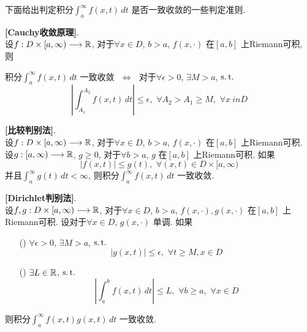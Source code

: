 \newpage

	下面给出判定积分$\int_{a}^{\infty} f(x , t) \, dt$ 是否一致收敛的一些判定准则. 

	\begin{proposition}\label{prop A.3.1}
		\textbf{[Cauchy收敛原理]}. \\
		设$f : D \times [a , \infty) \longrightarrow \mathbb{R}$, 对于$\forall x \in D$, $b > a$, $f(x , \cdot)$ 在$[a , b]$ 上Riemann可积, 则
		\begin{center}
			积分$\int_{a}^\infty f(x , t) \, dt$ 一致收敛 $\,\, \Leftrightarrow \,\,$ 对于$\forall \epsilon > 0$, $\exists M > a$, $\operatorname{s.t.}$
			\[ \left| \int_{A_1}^{A_2} f(x , t) \, dt \right| \leq \epsilon , \,\, \forall A_2 > A_1 \geq M , \,\, \forall x\ in D \]
		\end{center}
	\end{proposition}

	\vspace{8em}

	\begin{proposition}\label{prop A.3.2}
		\textbf{[比较判别法]}. \\
		设$f : D \times [a , \infty) \longrightarrow \mathbb{R}$, 对于$\forall x \in D$, $b > a$, $f(x , \cdot)$ 在$[a , b]$ 上Riemann可积. 设$g : [a , \infty) \longrightarrow \mathbb{R}$, $g \geq 0$, 对于$\forall b > a$, $g$ 在$[a , b]$ 上Riemann可积. 如果
		\[ \left| f(x  ,t) \right| \leq g(t) , \,\, \forall (x ,t) \in D \times [a , \infty) \]
		并且$\int_{a}^{\infty} g(t) \, dt < \infty$, 则积分$\int_{a}^{\infty} f(x , t) \, dt$ 一致收敛.
	\end{proposition}

	\vspace{8em}
	
	\begin{proposition}\label{prop A.3.3}
		\textbf{[Dirichlet判别法]}. \\
		设$f , g : D \times [a , \infty) \longrightarrow \mathbb{R}$, 对于$\forall x \in D$, $b > a$, $f(x , \cdot) , g(x , \cdot)$ 在$[a , b]$ 上Riemann可积. 设对于$\forall x \in D$, $g(x , \cdot)$ 单调. 如果
		\begin{enumerate}
			\item[(\rmnum{1})] $\forall \epsilon > 0$, $\exists M > a$, $\operatorname{s.t.}$
			\[ \left| g(x , t) \right| \leq \epsilon , \,\, \forall t \geq M , x \in D \]
			
			\item[(\rmnum{2})] $\exists L \in \mathbb{R}$, $\operatorname{s.t.}$
			\[ \left| \int_{a}^b f(x , t) \, dt \right| \leq L , \,\, \forall b \geq a , \,\, \forall x \in D \]
		\end{enumerate}
		则积分$\int_{a}^{\infty} f(x , t) g(x , t) \, dt$ 一致收敛.
	\end{proposition}
	
